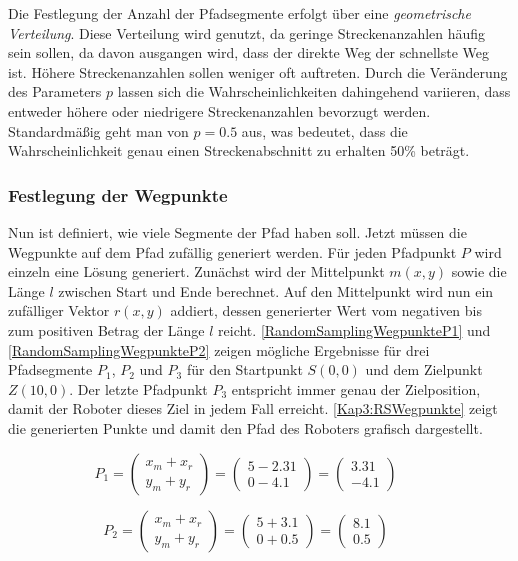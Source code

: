 Die Festlegung der Anzahl der Pfadsegmente erfolgt über eine \emph{geometrische Verteilung}. Diese Verteilung wird genutzt, da geringe Streckenanzahlen häufig sein sollen, da davon ausgangen wird, dass der direkte Weg der schnellste Weg ist. Höhere Streckenanzahlen sollen weniger oft auftreten. Durch die Veränderung des Parameters $p$ lassen sich die Wahrscheinlichkeiten dahingehend variieren, dass entweder höhere oder niedrigere Streckenanzahlen bevorzugt werden. Standardmäßig geht man von $p = 0.5$ aus, was bedeutet, dass die Wahrscheinlichkeit genau einen Streckenabschnitt zu erhalten 50\% beträgt.

\subsubsection{Festlegung der Wegpunkte}

Nun ist definiert, wie viele Segmente der Pfad haben soll. Jetzt müssen die Wegpunkte auf dem Pfad zufällig generiert werden. Für jeden Pfadpunkt $P$ wird einzeln eine Lösung generiert. Zunächst wird der Mittelpunkt $m(x, y)$ sowie die Länge $l$ zwischen Start und Ende berechnet. Auf den Mittelpunkt wird nun ein zufälliger Vektor $r(x, y)$ addiert, dessen generierter Wert vom negativen bis zum positiven Betrag der Länge $l$ reicht. \autoref{RandomSamplingWegpunkteP1} und \autoref{RandomSamplingWegpunkteP2} zeigen mögliche Ergebnisse für drei Pfadsegmente $P_1$, $P_2$ und $P_3$ für den Startpunkt $S(0,0)$ und dem Zielpunkt $Z(10,0)$. Der letzte Pfadpunkt $P_3$ entspricht immer genau der Zielposition, damit der Roboter dieses Ziel in jedem Fall erreicht. \autoref{Kap3:RSWegpunkte} zeigt die generierten Punkte und damit den Pfad des Roboters grafisch dargestellt.

\begin{equation}
  P_1=\left(\begin{array}{c} x_m + x_r \\ y_m + y_r \end{array}\right)=\left(\begin{array}{c} 5 - 2.31 \\ 0 - 4.1 \end{array}\right)=\left(\begin{array}{c} 3.31 \\ -4.1 \end{array}\right) \qquad
\label{RandomSamplingWegpunkteP1}
\end{equation}

\begin{equation}
  P_2=\left(\begin{array}{c} x_m + x_r \\ y_m + y_r \end{array}\right)=\left(\begin{array}{c} 5 + 3.1 \\ 0 + 0.5 \end{array}\right)=\left(\begin{array}{c} 8.1 \\ 0.5 \end{array}\right) \qquad
\label{RandomSamplingWegpunkteP2}
\end{equation}

